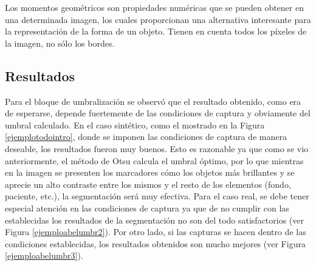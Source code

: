  Los momentos geométricos son propiedades numéricas que se pueden obtener en una determinada imagen, los cuales proporcionan una alternativa interesante para la representación de la forma de un objeto. Tienen en cuenta todos los píxeles de la imagen, no sólo los bordes.

 \subsection{Resultados}
 Para el bloque de umbralización se observó que el resultado obtenido, como era de esperarse, depende fuertemente de las condiciones de captura y obviamente del umbral calculado. En el caso sintético, como el mostrado en la Figura \ref{ejemplotodointro}, donde se imponen las condiciones de captura de manera deseable, los resultados fueron muy buenos. Esto es razonable ya que como se vio anteriormente, el método de Otsu calcula el umbral óptimo, por lo que mientras en la imagen se presenten los marcadores cómo los objetos más brillantes y se aprecie un alto contraste entre los mismos y el resto de los elementos (fondo, paciente, etc.), la segmentación será muy efectiva. Para el caso real, se debe tener especial atención en las condiciones de captura ya que de no cumplir con las establecidas los resultados de la segmentación no son del todo satisfactorios (ver Figura \ref{ejemploabelumbr2}). Por otro lado, si las capturas se hacen dentro de las condiciones establecidas, los resultados obtenidos son mucho mejores (ver Figura \ref{ejemploabelumbr3}).

